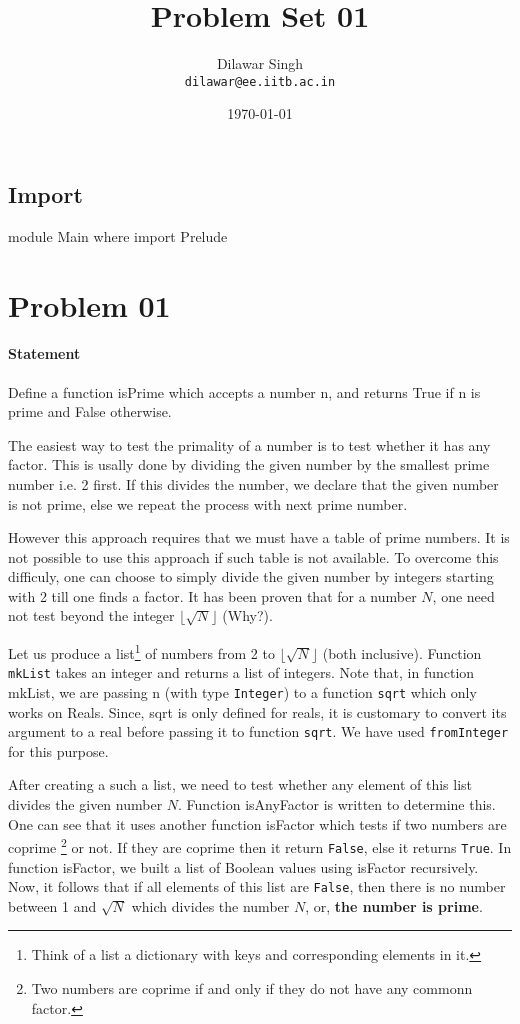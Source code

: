 \documentclass{report}%
\title{Problem Set 01}
\author{Dilawar Singh \\ 
\texttt{dilawar@ee.iitb.ac.in}}
\date{\today}
\begin{document}
 \maketitle

\subsection{Import}
\endmoddef\nwstartdeflinemarkup\nwenddeflinemarkup
module Main where
import Prelude

\nwendcode{}\nwdocspar
\section{Problem 01}
\paragraph{Statement}
Define a function isPrime which accepts a number n, and  returns  True
if n is prime and False otherwise.

The easiest way to test the primality of a number is to  test  whether
it has any  factor.   This  is  usally  done  by  dividing  the  given
number by the smallest prime number i.e. 2 first.  If this divides the
number, we declare that the given number is not prime, else we  repeat
the process with next prime number. 


However this approach requires that we must  have  a  table  of  prime
numbers. It is not possible to use this approach if such table is not
available. To overcome this difficuly, one can choose to simply divide
the given number by integers starting with 2 till one finds a factor.
It has been proven that for a number $N$, one need not test beyond the
integer $\lfloor \sqrt{N} \rfloor$ (Why?). 


Let us produce a list\footnote{Think of a list a dictionary with keys
and corresponding elements in it.} of numbers from 2 to $\lfloor
\sqrt{N} \rfloor$ (both inclusive). Function \texttt{mkList} takes an
integer and returns a list of integers. Note that, in function
{\Tt{}mkList\nwendquote}, we are passing n (with type \texttt{Integer}) to a
function \texttt{sqrt} which only works on Reals. Since, {\Tt{}sqrt\nwendquote} is
only defined for reals, it is customary to convert its argument to a
real before passing it to function \texttt{sqrt}. We have used
\texttt{fromInteger} for this purpose.


After creating a such a list, we need to test whether any element of
this list divides the given number $N$. Function {\Tt{}isAnyFactor\nwendquote} is
written to determine this. One can see that it uses another function
{\Tt{}isFactor\nwendquote} which tests if two numbers are coprime \footnote{Two
numbers are coprime if and only if they do not have any commonn
factor.} or not. If they are coprime then it return \texttt{False},
else it returns \texttt{True}. In function {\Tt{}isFactor\nwendquote}, we built a
    list of Boolean values using {\Tt{}isFactor\nwendquote} recursively. Now, it
    follows that if all elements of this list are \texttt{False}, then
    there is no number between 1 and $\sqrt{N}$ which divides the
    number $N$, or, \textbf{the number is prime}.
\end{document}
